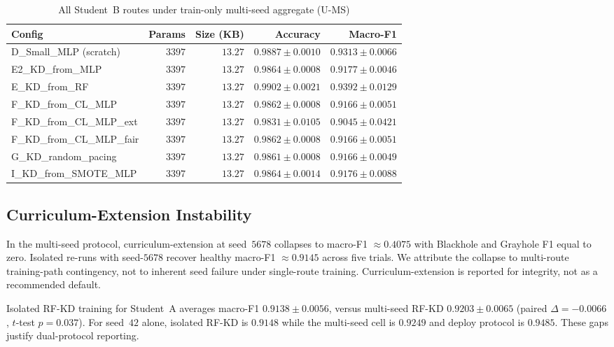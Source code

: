 \documentclass[journal]{IEEEtran}
\newcommand{\ums}{U-MS}
\begin{document}
\begin{table}[!t]
\caption{All Student~B routes under train-only multi-seed aggregate (\ums{})}
\label{tab:all-B}
\centering
\scriptsize
\begin{tabular}{lrrrr}
\toprule
Config & Params & Size (KB) & Accuracy & Macro-F1 \\
\midrule
D\_Small\_MLP (scratch) & $3397$ & $13.27$ & $0.9887 \pm 0.0010$ & $0.9313 \pm 0.0066$ \\
E2\_KD\_from\_MLP & $3397$ & $13.27$ & $0.9864 \pm 0.0008$ & $0.9177 \pm 0.0046$ \\
E\_KD\_from\_RF & $3397$ & $13.27$ & $0.9902 \pm 0.0021$ & $0.9392 \pm 0.0129$ \\
F\_KD\_from\_CL\_MLP & $3397$ & $13.27$ & $0.9862 \pm 0.0008$ & $0.9166 \pm 0.0051$ \\
F\_KD\_from\_CL\_MLP\_ext & $3397$ & $13.27$ & $0.9831 \pm 0.0105$ & $0.9045 \pm 0.0421$ \\
F\_KD\_from\_CL\_MLP\_fair & $3397$ & $13.27$ & $0.9862 \pm 0.0008$ & $0.9166 \pm 0.0051$ \\
G\_KD\_random\_pacing & $3397$ & $13.27$ & $0.9861 \pm 0.0008$ & $0.9166 \pm 0.0049$ \\
I\_KD\_from\_SMOTE\_MLP & $3397$ & $13.27$ & $0.9864 \pm 0.0014$ & $0.9176 \pm 0.0088$ \\
\bottomrule
\end{tabular}
\end{table}

\subsection{Curriculum-Extension Instability}
\label{sec:results-curriculum}
In the multi-seed protocol, curriculum-extension at seed~$5678$ collapses to macro-F1 $\approx 0.4075$ with Blackhole and Grayhole F1 equal to zero.
Isolated re-runs with seed-$5678$ recover healthy macro-F1 $\approx 0.9145$ across five trials.
We attribute the collapse to multi-route training-path contingency, not to inherent seed failure under single-route training.
Curriculum-extension is reported for integrity, not as a recommended default.

Isolated RF-KD training for Student~A averages macro-F1 $0.9138 \pm 0.0056$, versus multi-seed RF-KD $0.9203 \pm 0.0065$ (paired $\Delta = -0.0066$, $t$-test $p = 0.037$).
For seed~$42$ alone, isolated RF-KD is $0.9148$ while the multi-seed cell is $0.9249$ and deploy protocol is $0.9485$.
These gaps justify dual-protocol reporting.
\end{document}
